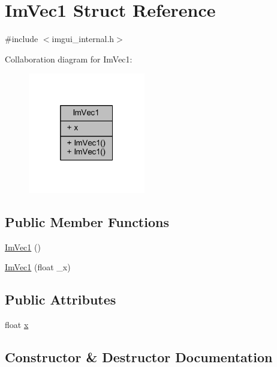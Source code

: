 \hypertarget{struct_im_vec1}{}\section{Im\+Vec1 Struct Reference}
\label{struct_im_vec1}


{\ttfamily \#include $<$imgui\+\_\+internal.\+h$>$}



Collaboration diagram for Im\+Vec1\+:
\nopagebreak
\begin{figure}[H]
\begin{center}
\leavevmode
\includegraphics[width=145pt]{struct_im_vec1__coll__graph}
\end{center}
\end{figure}
\subsection*{Public Member Functions}
\begin{DoxyCompactItemize}
\item 
\mbox{\hyperlink{struct_im_vec1_ab33951b3125979ab64cb4222138830a6}{Im\+Vec1}} ()
\item 
\mbox{\hyperlink{struct_im_vec1_aa17cbbe4525aa75d2ca65316fb2c0df9}{Im\+Vec1}} (float \+\_\+x)
\end{DoxyCompactItemize}
\subsection*{Public Attributes}
\begin{DoxyCompactItemize}
\item 
float \mbox{\hyperlink{struct_im_vec1_a825500197aa4fe7c4aa563ae547fd29b}{x}}
\end{DoxyCompactItemize}


\subsection{Constructor \& Destructor Documentation}
\mbox{\label{struct_im_vec1_ab33951b3125979ab64cb4222138830a6}} 
